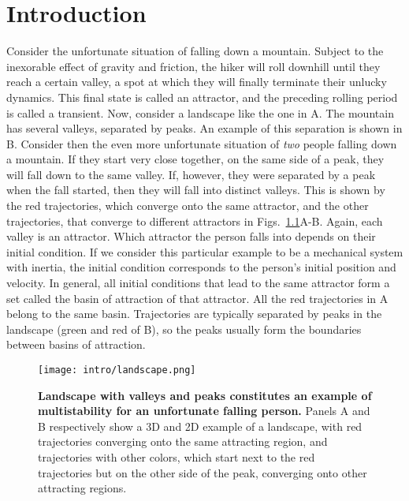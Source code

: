 \chapter{Introduction}
Consider the unfortunate situation of falling down a mountain. Subject to the inexorable effect of gravity and friction, the hiker will roll downhill until they reach a certain valley, a spot at which they will finally terminate their unlucky dynamics. This final state is called an attractor, and the preceding rolling period is called a transient. Now, consider a landscape like the one in A. The mountain has several valleys, separated by peaks. An example of this separation is shown in B. Consider then the even more unfortunate situation of \textit{two} people falling down a mountain. If they start very close together, on the same side of a peak, they will fall down to the same valley. If, however, they were separated by a peak when the fall started, then they will fall into distinct valleys. This is shown by the red trajectories, which converge onto the same attractor, and the other trajectories, that converge to different attractors in Figs.~\ref{fig:intro:landscape}A-B. Again, each valley is an attractor. Which attractor the person falls into depends on their initial condition. If we consider this particular example to be a mechanical system with inertia, the initial condition corresponds to the person's initial position and velocity. In general, all initial conditions that lead to the same attractor form a set called the basin of attraction of that attractor. All the red trajectories in A belong to the same basin. Trajectories are typically separated by peaks in the landscape (green and red of B), so the peaks usually form the boundaries between basins of attraction.
%
\begin{figure}[htb!]
    \centering
    \texttt{[image: intro/landscape.png]}
    \caption{\textbf{Landscape with valleys and peaks constitutes an example of multistability for an unfortunate falling person.} Panels A and B respectively show a 3D and 2D example of a landscape, with red trajectories converging onto the same attracting region, and trajectories with other colors, which start next to the red trajectories but on the other side of the peak, converging onto other attracting regions.}
    \label{fig:intro:landscape}
\end{figure}

